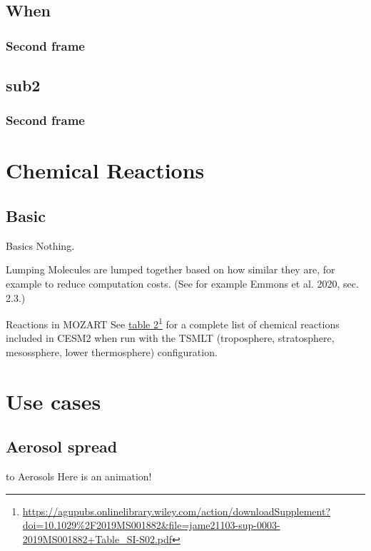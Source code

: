 \documentclass[xcolor=dvipsnames]{beamer} %
\begin{document}
\subsection{When}
\begin{frame}
	\frametitle{Second frame}
\end{frame}

\subsection{sub2}
\begin{frame}
	\frametitle{Second frame}
\end{frame}

\section{Chemical Reactions}

\subsection{Basic}
\begin{frame}{Basics}
	Nothing.
\end{frame}

\begin{frame}{Lumping}
	Molecules are lumped together based on how similar they are, for example to reduce computation costs.
	(See for example Emmons et al. 2020, sec. 2.3.)
\end{frame}

\begin{frame}{Reactions in MOZART}
	See \href{https://agupubs.onlinelibrary.wiley.com/action/downloadSupplement?doi=10.1029\%2F2019MS001882&file=jame21103-sup-0003-2019MS001882+Table_SI-S02.pdf}{table 2}\footnote{
		\url{https://agupubs.onlinelibrary.wiley.com/action/downloadSupplement?doi=10.1029\%2F2019MS001882&file=jame21103-sup-0003-2019MS001882+Table_SI-S02.pdf}}
	for a complete list of chemical reactions included in CESM2 when run with the TSMLT
	(troposphere, stratosphere, mesossphere, lower thermosphere) configuration.
\end{frame}

\section{Use cases}

\subsection{Aerosol spread}
\begin{frame}{\texorpdfstring{}{SO2} to Aerosols}
	Here is an animation!
\end{frame}
\end{document}
